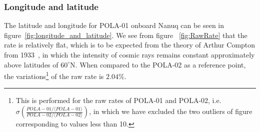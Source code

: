 \documentclass[12pt,a4paper]{amsart}
\begin{document}
\subsubsection{Longitude and latitude}
The latitude and longitude for POLA-01 onboard Nanuq can be seen in figure~\ref{fig:longitude_and_latitude}. We see from figure ~\ref{fig:RawRate} that the rate is relatively flat, which is to be expected from the theory of Arthur Compton from 1933~\cite{Compton1933}, in which the intensity of cosmic rays remains constant approximately above latitudes of $60^\circ$N. When compared to the POLA-02 as a reference point, the variations\footnote{This is performed for the raw rates of POLA-01 and POLA-02, i.e. $\sigma\left(\frac{POLA-01/\langle POLA-01\rangle}{POLA-02/\langle POLA-02 \rangle}\right)$, in which we have excluded the two outliers of figure~ corresponding to values less than 10.} of the raw rate is $2.04\%$. 
\end{document}
